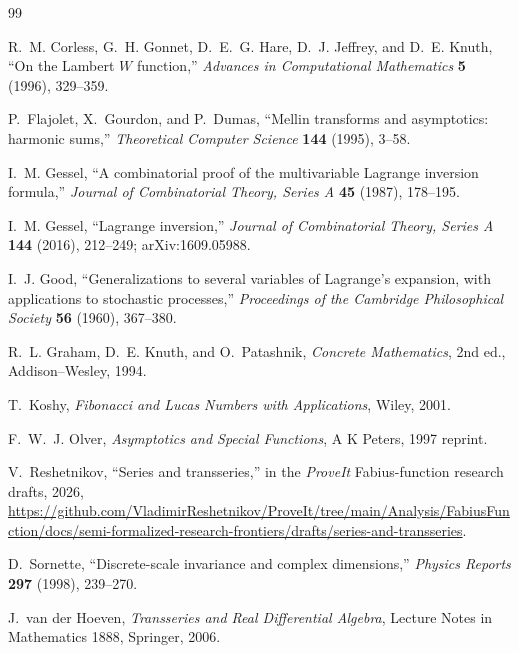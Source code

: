 \documentclass[11pt,oneside]{article}
\numberwithin{equation}{section}
\theoremstyle{plain}
\theoremstyle{definition}
\theoremstyle{remark}
\begin{document}
\begin{thebibliography}{99}

R.~M. Corless, G.~H. Gonnet, D.~E.~G. Hare, D.~J. Jeffrey, and D.~E. Knuth,
``On the Lambert \(W\) function,''
\emph{Advances in Computational Mathematics} \textbf{5} (1996), 329--359.

P.~Flajolet, X.~Gourdon, and P.~Dumas,
``Mellin transforms and asymptotics: harmonic sums,''
\emph{Theoretical Computer Science} \textbf{144} (1995), 3--58.

I.~M. Gessel,
``A combinatorial proof of the multivariable Lagrange inversion formula,''
\emph{Journal of Combinatorial Theory, Series A} \textbf{45} (1987),
178--195.

I.~M. Gessel,
``Lagrange inversion,''
\emph{Journal of Combinatorial Theory, Series A} \textbf{144} (2016),
212--249; arXiv:1609.05988.

I.~J. Good,
``Generalizations to several variables of Lagrange's expansion, with
applications to stochastic processes,''
\emph{Proceedings of the Cambridge Philosophical Society} \textbf{56}
(1960), 367--380.

R.~L. Graham, D.~E. Knuth, and O.~Patashnik,
\emph{Concrete Mathematics}, 2nd ed., Addison--Wesley, 1994.

T.~Koshy,
\emph{Fibonacci and Lucas Numbers with Applications}, Wiley, 2001.

F.~W.~J. Olver,
\emph{Asymptotics and Special Functions}, A K Peters, 1997 reprint.

V.~Reshetnikov,
``Series and transseries,'' in the \emph{ProveIt} Fabius-function research
drafts, 2026,
\url{https://github.com/VladimirReshetnikov/ProveIt/tree/main/Analysis/FabiusFunction/docs/semi-formalized-research-frontiers/drafts/series-and-transseries}.

D.~Sornette,
``Discrete-scale invariance and complex dimensions,''
\emph{Physics Reports} \textbf{297} (1998), 239--270.

J.~van der Hoeven,
\emph{Transseries and Real Differential Algebra},
Lecture Notes in Mathematics 1888, Springer, 2006.

\end{thebibliography}
\end{document}
